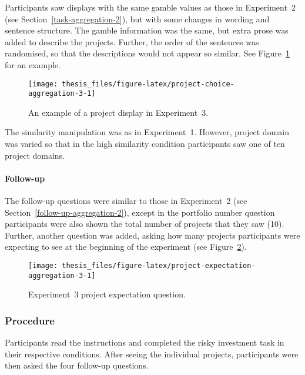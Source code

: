\documentclass[a4paper, nobind]{templates/ociamthesis}
\theoremstyle{definition}
\theoremstyle{definition}
\theoremstyle{definition}
\theoremstyle{definition}
\theoremstyle{remark}
\begin{document}
Participants saw displays with the same gamble values as those in Experiment~2
(see Section~\ref{task-aggregation-2}), but with some changes in wording and
sentence structure. The gamble information was the same, but extra prose was
added to describe the projects. Further, the order of the sentences was
randomised, so that the descriptions would not appear so similar. See
Figure~\ref{fig:project-choice-aggregation-3} for an example.



\begin{figure}
\texttt{[image: thesis\_files/figure-latex/project-choice-aggregation-3-1]} \caption{An example of a project display in Experiment~3.}\label{fig:project-choice-aggregation-3}
\end{figure}

The similarity manipulation was as in Experiment~1. However, project domain was
varied so that in the high similarity condition participants saw one of ten
project domains.

\hypertarget{follow-up-aggregation-3}{%
\paragraph{Follow-up}\label{follow-up-aggregation-3}}

The follow-up questions were similar to those in Experiment~2 (see
Section~\ref{follow-up-aggregation-2}), except in the portfolio number question
participants were also shown the total number of projects that they saw (10).
Further, another question was added, asking how many projects participants were
expecting to see at the beginning of the experiment (see
Figure~\ref{fig:project-expectation-aggregation-3}).



\begin{figure}
\texttt{[image: thesis\_files/figure-latex/project-expectation-aggregation-3-1]} \caption{Experiment~3 project expectation question.}\label{fig:project-expectation-aggregation-3}
\end{figure}

\subsubsection{Procedure}

Participants read the instructions and completed the risky investment task in
their respective conditions. After seeing the individual projects, participants
were then asked the four follow-up questions.
\end{document}

